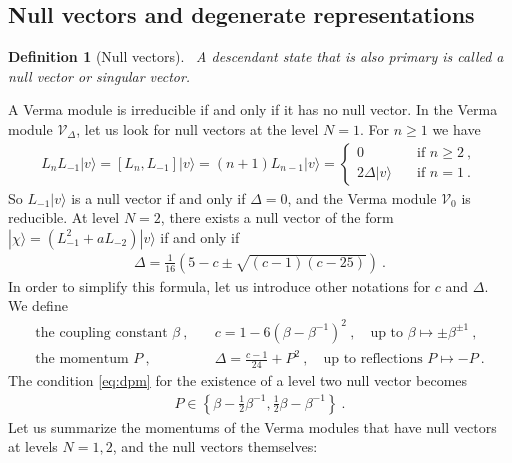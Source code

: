 \documentclass[12pt, a4paper]{article}
\theoremstyle{break}
\newtheorem{defn}[exo]{Definition}
\begin{document}
\subsection{Null vectors and degenerate representations}\label{sec:nv}

\begin{defn}[Null vectors]
 ~\label{def:nv}
 A descendant state that is also primary is called a null vector or singular vector.
\end{defn}
A Verma module is irreducible if and only if it has no null vector.
In the Verma module $\mathcal V_\Delta$, let us look for null vectors at the level $N=1$. For $n\geq 1$ we have 
\begin{align}
L_n L_{-1}|v\rangle = [L_n, L_{-1}] |v\rangle = (n+1) L_{n-1}|v\rangle = 
\left\{\begin{array}{ll} 0 &  \quad \text{if } n\geq 2\ , \\ 2\Delta |v\rangle & \quad \text{if } n = 1\ . \end{array}\right. 
\end{align}
So $L_{-1}|v\rangle$ is a null vector if and only if $\Delta=0$, and the Verma module $\mathcal V_0$ is reducible.
At level $N=2$, there exists a null vector of the form $|\chi\rangle = (L_{-1}^2 + a L_{-2})|v\rangle$ if and only if 
 \begin{align}
 \Delta = \frac{1}{16}\left( 5-c\pm\sqrt{(c-1)(c-25)} \right) \ .
 \label{eq:dpm}
\end{align}
In order to simplify this formula, let us introduce other notations for $c$ and $\Delta$. We define
\begin{align}
 \text{the coupling constant } \beta \ , & \quad c = 1-6\left(\beta-\beta^{-1}\right)^2 \ , \quad \text{up to } \beta\mapsto \pm \beta^{\pm 1}\ ,
 \\
 \text{the momentum } P\  , &\quad \Delta = \frac{c-1}{24}+P^2\ , \quad \text{up to reflections } P \mapsto -P\ .
\label{eq:refm}
 \end{align}
The condition \eqref{eq:dpm} for the existence of a level two null vector becomes 
\begin{align}
 P \in \left\{ \beta - \tfrac12 \beta^{-1},\tfrac12 \beta - \beta^{-1}\right\} \ .
\end{align}
Let us summarize the momentums of the Verma modules that have null vectors at levels $N=1,2$, and the null vectors themselves:
\end{document}

